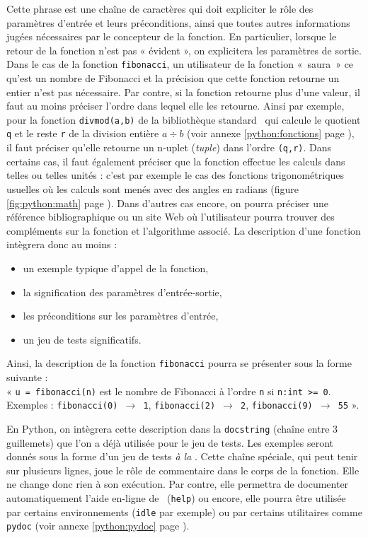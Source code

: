 Cette phrase est une chaîne de caractères qui doit expliciter le rôle
des paramètres d'entrée et leurs préconditions, ainsi que toutes autres informations
jugées nécessaires par le concepteur de la fonction. 
En particulier, lorsque le retour de la fonction n'est pas « évident », on 
explicitera les paramètres de sortie. Dans le cas de la fonction {\tt fibonacci},
un utilisateur de la fonction «~saura~» ce qu'est un nombre de Fibonacci et la précision
que cette fonction retourne un entier n'est pas nécessaire. Par contre, si la fonction 
retourne plus d'une valeur, il faut au moins préciser l'ordre dans lequel elle les retourne.
Ainsi par exemple, pour la fonction {\tt divmod(a,b)} de la bibliothèque standard 
\python\ qui calcule le quotient {\tt q} et le reste {\tt r} de la division entière $a\div b$
(voir annexe \ref{python:fonctions} page \pageref{python:fonctions}), il faut préciser
qu'elle retourne un n-uplet ({\em tuple}) dans l'ordre {\tt (q,r)}. 
Dans certains cas, il faut
également préciser que la fonction effectue les calculs dans telles ou telles unités : c'est 
par exemple le cas des fonctions trigonométriques usuelles où les calculs sont menés avec 
des angles en radians (figure \ref{fig:python:math} page \pageref{fig:python:math}). 
Dans d'autres cas encore, on pourra préciser une référence bibliographique ou un site {\sc Web}
où l'utilisateur pourra trouver des compléments sur la fonction et l'algorithme associé.
La description d'une fonction intègrera donc au moins :
\begin{itemize}
\item un exemple typique d'appel de la fonction,
\item la signification des paramètres d'entrée-sortie,
\item les préconditions sur les paramètres d'entrée,
\item un jeu de tests significatifs.
\end{itemize}
Ainsi, la description de la fonction {\tt fibonacci} pourra se présenter sous la forme suivante :\\
« {\tt u = fibonacci(n)} est le nombre de Fibonacci à l'ordre {\tt n} si {\tt n:int >= 0}.\\
Exemples : {\tt fibonacci(0) $\rightarrow$ 1}, {\tt fibonacci(2) $\rightarrow$ 2}, 
{\tt fibonacci(9) $\rightarrow$ 55} ».

En {\sc Python}, on intègrera cette description dans la {\tt docstring} (chaîne entre 3 guillemets) 
que l'on a déjà utilisée pour le jeu de tests. Les exemples seront donnés sous la forme d'un jeu de tests
{\em à la \python}.
Cette chaîne spéciale, qui peut tenir
sur plusieurs lignes, joue le rôle de commentaire dans le corps de la fonction.
Elle ne change donc rien à son exécution. Par contre, 
elle permettra de documenter automatiquement l'aide en-ligne de \python\ ({\tt help})
ou encore, elle pourra être utilisée par certains environnements ({\tt idle} par exemple) 
ou par certains utilitaires comme {\tt pydoc} 
(voir annexe \ref{python:pydoc} page \pageref{python:pydoc}).

